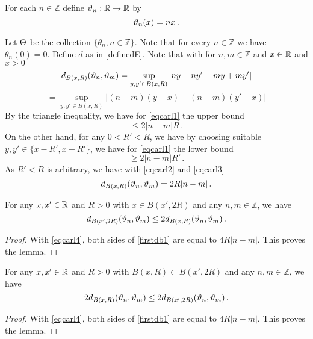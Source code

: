 For each $n\in \mathbb{Z}$ define
$\vartheta_n:\mathbb{R}\to \mathbb{R}$ by
\begin{equation}
    \vartheta_n(x)=nx\, .
\end{equation}


Let $\Theta$ be the collection $\{\theta_n, n\in \mathbb{Z}\}$.
Note that for every $n\in \mathbb{Z}$ we have $\theta_n(0)=0$.
Define $d$ as in \eqref{definedE}. Note that
with for
$n,m\in \mathbb{Z}$ and $x\in \mathbb{R}$ and $x>0$
\begin{equation}
    d_{B(x,R)}(\vartheta_n,\vartheta_m)=\sup_{y,y'\in B(x,R)}|ny-ny'-my+my'|
\end{equation}
\begin{equation}\label{eqcarl1}
        =\sup_{y,y'\in B(x,R)}|(n-m)(y-x)-(n-m)(y'-x)|
    \end{equation}
By the triangle inequality, we have for \eqref{eqcarl1} the upper bound
\begin{equation}\label{eqcarl2}
        \le 2|n-m|R\, .
    \end{equation}
On the other hand, for any $0<R'<R$, we have
by choosing suitable $y,y'\in \{x-R', x+R'\}$,
we have for \eqref{eqcarl1} the lower bound
\begin{equation}\label{eqcarl3}
        \ge 2|n-m|R'\, .
    \end{equation}
As $R'<R$ is arbitrary, we have with \eqref{eqcarl2}
and \eqref{eqcarl3}
\begin{equation}\label{eqcarl4}
    d_{B(x,R)}(\vartheta_n,\vartheta_m)=2R|n-m|\, .
\end{equation}



\begin{lemma}\label{lem fdb1}
    For any $x,x'\in \mathbb{R}$ and $R>0$ with
    $x\in B(x',2R)$  and any $n,m\in \mathbb{Z}$, we have
\begin{equation}\label{firstdb1}
    d_{B(x',2R)}(\vartheta_n,\vartheta_m)\le 2 d_{B(x,R)}(\vartheta_n,\vartheta_m) \, .
\end{equation}
\end{lemma}
\begin{proof}
With \eqref{eqcarl4}, both sides of \eqref{firstdb1} are equal to $4R|n-m|$. This proves the lemma.
\end{proof}

\begin{lemma}\label{lem sdb1}
    For any $x,x'\in \mathbb{R}$ and $R>0$ with
    $B(x,R)\subset B(x',2R)$  and any $n,m\in \mathbb{Z}$, we have
\begin{equation}\label{seconddb1}
    2d_{B(x,R)}(\vartheta_n,\vartheta_m)\le 2 d_{B(x',2R)}(\vartheta_n,\vartheta_m) \, .
\end{equation}
\end{lemma}
\begin{proof}
With \eqref{eqcarl4}, both sides of \eqref{firstdb1} are equal to $4R|n-m|$. This proves the lemma.
\end{proof}


